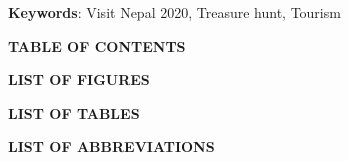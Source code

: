 \documentclass[12pt, a4paper, oneside]{article}
\begin{document}
\textbf{Keywords}: Visit Nepal 2020, Treasure hunt, Tourism\\

\break







\large
{}
\begin{center}
	\textbf{TABLE OF CONTENTS}
\end{center}
\normalsize
\setlength{\cftbeforetoctitleskip}{0pt}
\renewcommand{\contentsname}{}
\tableofcontents

\break










\large
{}
\begin{center}
	\textbf{LIST OF FIGURES}
\end{center}
\renewcommand{\listfigurename}{}
\listoffigures

\break










\large
{}
\begin{center}
	\textbf{LIST OF TABLES}
\end{center}
\renewcommand{\listtablename}{}
\listoftables

\break












\large
{}
\begin{center}
	\textbf{LIST OF ABBREVIATIONS}
\end{center}
\end{document}
